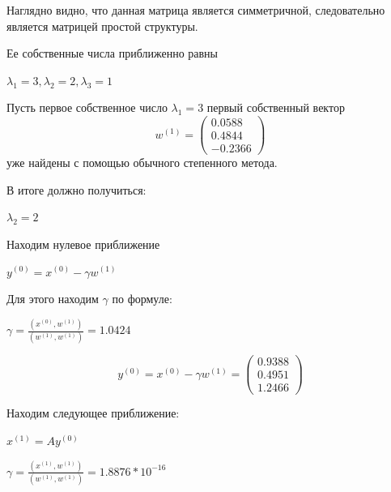 Наглядно видно, что данная матрица является симметричной, следовательно является матрицей простой структуры.

Ее собственные числа приближенно равны 

\begin{math}
 \lambda_{1}=3,\lambda_{2}=2, \lambda_{3}=1
\end{math}
 
 Пусть первое собственное число 
 \begin{math}
 	\lambda_{1}=3
 \end{math} 
первый собственный вектор 
\begin{equation*}
	w^{(1)} =
	\begin{pmatrix}
		 0.0588 \\
		0.4844 \\
		-0.2366
	\end{pmatrix}
\end{equation*}
 уже найдены с помощью обычного степенного метода. 
 
 
 В итоге должно получиться:
 
  \begin{math}
 	\lambda_{2}=2
 \end{math} 
 
Находим нулевое приближение

\begin{math}
	y^{(0)}= x^{(0)}-\gamma w^{(1)}
\end{math}

Для этого находим 
\begin{math}
	\gamma
\end{math}
по формуле: 

\begin{math}
	\gamma=\frac{(x^{(0)},w^{(1)})}{(w^{(1)},w^{(1)})}=1.0424
\end{math}

\begin{equation}
	y^{(0)}= x^{(0)}-\gamma w^{(1)}=
	\begin{pmatrix}
		0.9388 \\
		0.4951 \\
		1.2466
	\end{pmatrix}
\end{equation}

Находим следующее приближение: 

\begin{math}
	x^{(1)}=Ay^{(0)}
\end{math}

\begin{math}
	\gamma=\frac{(x^{(1)},w^{(1)})}{(w^{(1)},w^{(1)})}=1.8876*10^{-16}
\end{math}


